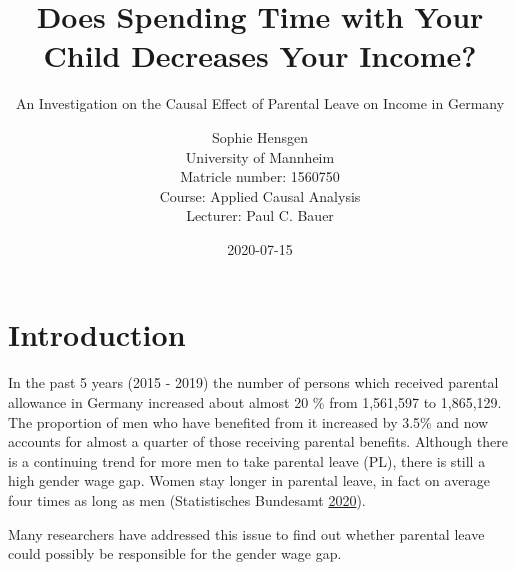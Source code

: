 \documentclass[
  12pt,
]{article}
\title{\vspace{1cm}Does Spending Time with Your Child Decreases Your Income?\vspace{0.5cm}\\}
\subtitle{An Investigation on the Causal Effect of Parental Leave on Income in Germany \vspace{0.5cm}}
\author{Sophie Hensgen\\
University of Mannheim\\
Matricle number: 1560750\\
Course: Applied Causal Analysis\\
Lecturer: Paul C. Bauer}
\date{2020-07-15\\}
\begin{document}
\maketitle

\hypertarget{introduction}{%
\section{Introduction}\label{introduction}}

In the past 5 years (2015 - 2019) the number of persons which received parental allowance in Germany increased about almost 20 \% from 1,561,597 to 1,865,129. The proportion of men who have benefited from it increased by 3.5\% and now accounts for almost a quarter of those receiving parental benefits. Although there is a continuing trend for more men to take parental leave (PL), there is still a high gender wage gap. Women stay longer in parental leave, in fact on average four times as long as men (Statistisches Bundesamt \protect\hyperlink{ref-statistisches_bundesamt_zeitreihe_2020}{2020}).

Many researchers have addressed this issue to find out whether parental leave could possibly be responsible for the gender wage gap.
\end{document}
